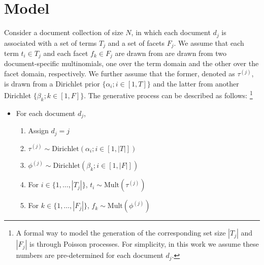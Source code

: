 % 
% 
% 

\section{Model}


Consider a document collection of size $N$, in which each document $d_j$ is
associated with a set of terms $T_j$ and a set of facets $F_j$.  We assume that
each term $t_i \in T_j$ and each facet $f_k \in F_j$ are drawn from are drawn
from two document-specific multinomials, one over the term domain and the other
over the facet domain, respectively.  We further assume that the former,
denoted as $\tau^{(j)}$, is drawn from a Dirichlet prior $\{ \alpha_i; i \in
[1, T] \}$ and the latter from another Dirichlet $\{ \beta_k; k \in [1, F] \}$.
The generative process can be described as follows: \footnote{A formal way to
model the generation of the corresponding set size $|T_j|$ and $|F_j|$ is
through Poisson processes.  For simplicity, in this work we assume these
numbers are pre-determined for each document $d_j$.} 

\begin{itemize} 
  \item For each document $d_j$, \begin{enumerate}
    \item Assign $d_j = j$
    \item $\tau^{(j)} \sim \textrm{Dirichlet}(\alpha_i; i \in [1, |T|])$
    \item $\phi^{(j)} \sim \textrm{Dirichlet}(\beta_k; i \in [1, |F|])$
    \item For $i \in \{ 1, \ldots, |T_j| \}$, $t_i \sim \textrm{Mult}(\tau^{(j)})$ 
    \item For $k \in \{ 1, \ldots, |F_j| \}$, $f_k \sim \textrm{Mult}(\phi^{(j)})$ 
  \end{enumerate}
\end{itemize}

